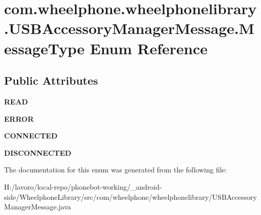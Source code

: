 \section{com.\-wheelphone.\-wheelphonelibrary.\-U\-S\-B\-Accessory\-Manager\-Message.\-Message\-Type \-Enum \-Reference}
\label{enumcom_1_1wheelphone_1_1wheelphonelibrary_1_1_u_s_b_accessory_manager_message_1_1_message_type}
\subsection*{\-Public \-Attributes}
\begin{DoxyCompactItemize}
\item 
{\bfseries \-R\-E\-A\-D}\label{enumcom_1_1wheelphone_1_1wheelphonelibrary_1_1_u_s_b_accessory_manager_message_1_1_message_type_aa0b97cb19b086fe7e15b1e3135ce2d05}

\item 
{\bfseries \-E\-R\-R\-O\-R}\label{enumcom_1_1wheelphone_1_1wheelphonelibrary_1_1_u_s_b_accessory_manager_message_1_1_message_type_a0efb4d8b55773e95ff78f3b98718d020}

\item 
{\bfseries \-C\-O\-N\-N\-E\-C\-T\-E\-D}\label{enumcom_1_1wheelphone_1_1wheelphonelibrary_1_1_u_s_b_accessory_manager_message_1_1_message_type_a545374a87346dcb6abe4649a93fbab0b}

\item 
{\bfseries \-D\-I\-S\-C\-O\-N\-N\-E\-C\-T\-E\-D}\label{enumcom_1_1wheelphone_1_1wheelphonelibrary_1_1_u_s_b_accessory_manager_message_1_1_message_type_a6fa8218ad443c3a18815d96a1f8d580a}

\end{DoxyCompactItemize}


\-The documentation for this enum was generated from the following file\-:\begin{DoxyCompactItemize}
\item 
\-H\-:/lavoro/local-\/repo/phonebot-\/working/\-\_\-android-\/side/\-Wheelphone\-Library/src/com/wheelphone/wheelphonelibrary/\-U\-S\-B\-Accessory\-Manager\-Message.\-java\end{DoxyCompactItemize}
